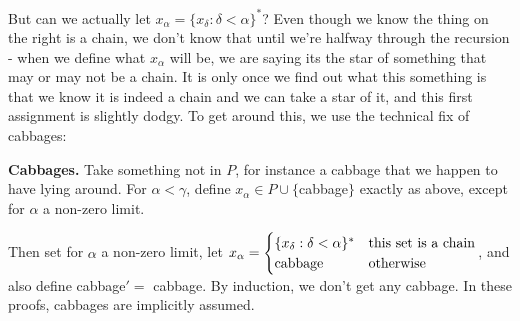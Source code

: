 \documentclass[10pt,a4paper]{article}
\begin{document}
But can we actually let $x_{\alpha} = \{x_{\delta} : \delta < \alpha\}^{\ast}$? Even though we know the thing on the right is a chain, we don't know that until we're halfway through the recursion - when we define what $x_\alpha$ will be, we are saying its the star of something that may or may not be a chain. It is only once we find out what this something is that we know it is indeed a chain and we can take a star of it, and this first assignment is slightly dodgy. To get around this, we use the technical fix of cabbages:

\textbf{Cabbages.} Take something not in $P$, for instance a cabbage that we happen to have lying around. For $\alpha < \gamma$, define $x_\alpha \in P\cup \{$cabbage$\}$ exactly as above, except for $\alpha$ a non-zero limit.

Then set for $\alpha$ a non-zero limit, let $x_\alpha = \begin{cases} \{x_\delta:\delta<\alpha\}^{\ast} & \text{this set is a chain}\\ \text{cabbage} & \text{otherwise}\end{cases}$, and also define cabbage$' = $ cabbage. By induction, we don't get any cabbage. In these proofs, cabbages are implicitly assumed.
\end{document}
